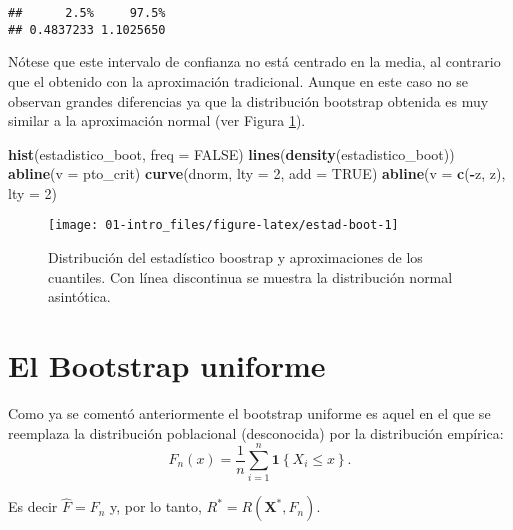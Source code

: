 \documentclass[
]{book}
\newenvironment{Shaded}{\begin{snugshade}}{\end{snugshade}}
\newcommand{\DataTypeTok}[1]{\textcolor[rgb]{0.13,0.29,0.53}{#1}}
\newcommand{\DecValTok}[1]{\textcolor[rgb]{0.00,0.00,0.81}{#1}}
\newcommand{\KeywordTok}[1]{\textcolor[rgb]{0.13,0.29,0.53}{\textbf{#1}}}
\newcommand{\NormalTok}[1]{#1}
\newcommand{\OperatorTok}[1]{\textcolor[rgb]{0.81,0.36,0.00}{\textbf{#1}}}
\newcommand{\OtherTok}[1]{\textcolor[rgb]{0.56,0.35,0.01}{#1}}
\theoremstyle{definition}
\theoremstyle{definition}
\theoremstyle{definition}
\theoremstyle{remark}
\begin{document}
\begin{verbatim}
##      2.5%     97.5% 
## 0.4837233 1.1025650
\end{verbatim}

Nótese que este intervalo de confianza no está centrado en la media,
al contrario que el obtenido con la aproximación tradicional.
Aunque en este caso no se observan grandes diferencias ya que
la distribución bootstrap obtenida es muy similar a la aproximación normal
(ver Figura \ref{fig:estad-boot}).

\begin{Shaded}
\begin{Highlighting}[]
\KeywordTok{hist}\NormalTok{(estadistico_boot, }\DataTypeTok{freq =} \OtherTok{FALSE}\NormalTok{)}
\KeywordTok{lines}\NormalTok{(}\KeywordTok{density}\NormalTok{(estadistico_boot))}
\KeywordTok{abline}\NormalTok{(}\DataTypeTok{v =}\NormalTok{ pto_crit)}
\KeywordTok{curve}\NormalTok{(dnorm, }\DataTypeTok{lty =} \DecValTok{2}\NormalTok{, }\DataTypeTok{add =} \OtherTok{TRUE}\NormalTok{)}
\KeywordTok{abline}\NormalTok{(}\DataTypeTok{v =} \KeywordTok{c}\NormalTok{(}\OperatorTok{-}\NormalTok{z, z), }\DataTypeTok{lty =} \DecValTok{2}\NormalTok{)}
\end{Highlighting}
\end{Shaded}

\begin{figure}[!htb]

{\centering \texttt{[image: 01-intro\_files/figure-latex/estad-boot-1]} 

}

\caption{Distribución del estadístico boostrap y aproximaciones de los cuantiles. Con línea discontinua se muestra la distribución normal asintótica.}\label{fig:estad-boot}
\end{figure}

\hypertarget{cap1-unif}{%
\section{El Bootstrap uniforme}\label{cap1-unif}}

Como ya se comentó anteriormente el bootstrap uniforme es aquel en el que
se reemplaza la distribución poblacional (desconocida) por la distribución
empírica:
\[F_n\left( x \right) =\frac{1}{n}\sum_{i=1}^{n}\mathbf{1}\left\{ X_i\leq x\right\}.\]

Es decir \(\hat{F}=F_n\) y, por lo tanto,
\(R^{\ast}=R\left( \mathbf{X}^{\ast},F_n \right)\).
\end{document}
